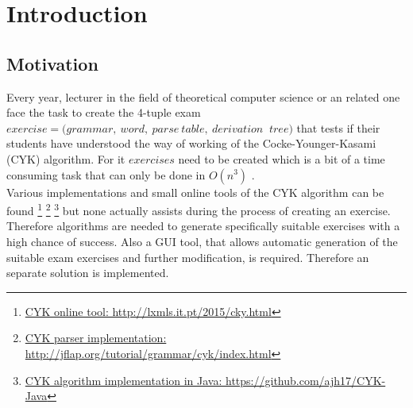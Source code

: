 
\section{Introduction}\label{Introduction}

\subsection{Motivation}
Every year, lecturer in the field of theoretical computer science or an related one face the task to create the 4-tuple exam $exercise = (grammar,\ word,\ parse\ table,\ derivation\ $ $tree)$ that tests if their students have understood the way of working of the Cocke-Younger-Kasami (CYK) algorithm. For it $exercises$ need to be created which is a bit of a time consuming task that can only be done in $O(n^3)$ \cite{YOUNGER.1967}. \\
Various implementations and small online tools of the CYK algorithm can be found \footnote{\href{http://lxmls.it.pt/2015/cky.html}{CYK online tool: http://lxmls.it.pt/2015/cky.html}} \footnote{\href{http://jflap.org/tutorial/grammar/cyk/index.html}{CYK parser implementation: http://jflap.org/tutorial/grammar/cyk/index.html}} \footnote{\href{https://github.com/ajh17/CYK-Java}{CYK algorithm implementation in Java: https://github.com/ajh17/CYK-Java}} but none actually assists during the process of creating an exercise.\\
Therefore algorithms are needed to generate specifically suitable exercises with a high chance of success. Also a GUI tool, that allows automatic generation of the suitable exam exercises and further modification, is required. Therefore an separate solution is implemented.

